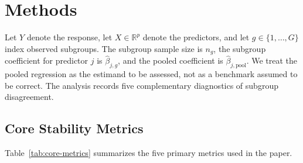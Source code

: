 \section{Methods}\label{sec:methods}

Let $Y$ denote the response, let $X \in \mathbb{R}^p$ denote the predictors, and let $g \in \{1,\dots,G\}$ index observed subgroups. The subgroup sample size is $n_g$, the subgroup coefficient for predictor $j$ is $\hat{\beta}_{j,g}$, and the pooled coefficient is $\hat{\beta}_{j,\mathrm{pool}}$. We treat the pooled regression as the estimand to be assessed, not as a benchmark assumed to be correct. The analysis records five complementary diagnostics of subgroup disagreement.

\subsection{Core Stability Metrics}

Table~\ref{tab:core-metrics} summarizes the five primary metrics used in the paper.

